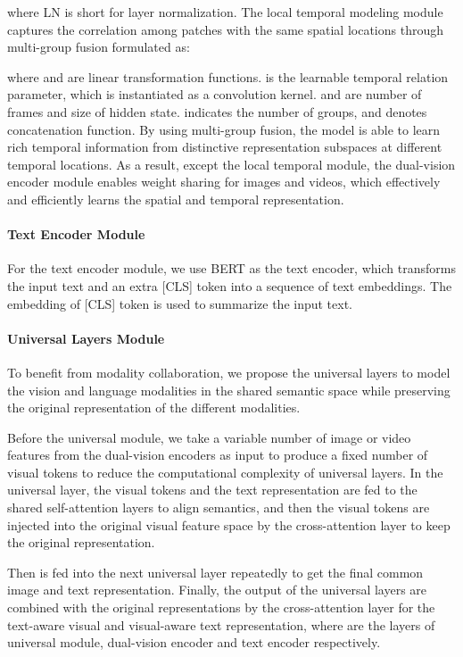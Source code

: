 \documentclass{article}
\theoremstyle{plain}
\theoremstyle{definition}
\theoremstyle{remark}
\begin{document}
where LN is short for layer normalization. The local temporal modeling module captures the correlation among patches with the same spatial locations through multi-group fusion formulated as:

where  and  are linear transformation functions.  is the learnable temporal relation parameter, which is instantiated as a convolution kernel.  and  are number of frames and size of hidden state.  indicates the number of groups, and  denotes concatenation function. By using multi-group fusion, the model is able to learn rich temporal information from distinctive representation subspaces at different temporal locations. As a result, except the local temporal module, the dual-vision encoder module enables weight sharing for images and videos, which effectively and efficiently learns the spatial and temporal representation.


\paragraph{Text Encoder Module}
For the text encoder module, we use BERT \citep{devlin2018bert} as the text encoder, which transforms the input text and an extra [CLS] token into a sequence of text embeddings. The embedding of [CLS] token is used to summarize the input text.

\paragraph{Universal Layers Module}
To benefit from modality collaboration, we propose the universal layers to model the vision and language modalities in the shared semantic space while preserving the original representation of the different modalities.

Before the universal module, we take a variable number of image or video features  from the dual-vision encoders as input to produce a fixed number  of visual tokens  to reduce the computational complexity of universal layers.
In the  universal layer, the visual tokens  and the text representation  are fed to the shared self-attention layers to align semantics, and then the visual tokens are injected into the original visual feature space by the cross-attention layer to keep the original representation.





Then  is fed into the next universal layer repeatedly to get the final common image and text representation. Finally, the output of the universal layers  are combined with the original representations  by the cross-attention layer for the text-aware visual and visual-aware text representation, where  are the layers of universal module, dual-vision encoder and text encoder respectively.
\end{document}
